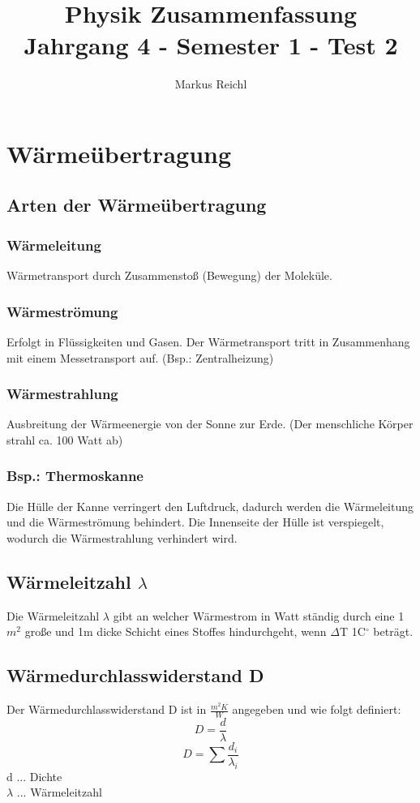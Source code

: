 \documentclass[a4paper,12pt]{article}
\title{Physik Zusammenfassung\\	\large{Jahrgang 4 - Semester 1 - Test 2}}
\author{Markus Reichl}
\begin{document}
\maketitle

\tableofcontents

\newpage

\section{Wärmeübertragung}
\subsection{Arten der Wärmeübertragung}
\subsubsection{Wärmeleitung}
Wärmetransport durch Zusammenstoß (Bewegung) der Moleküle.
\subsubsection{Wärmeströmung}
Erfolgt in Flüssigkeiten und Gasen. Der Wärmetransport tritt in Zusammenhang mit einem Messetransport auf. (Bsp.: Zentralheizung)
\subsubsection{Wärmestrahlung}
Ausbreitung der Wärmeenergie von der Sonne zur Erde. (Der menschliche Körper strahl ca. 100 Watt ab)
\subsubsection{Bsp.: Thermoskanne}
Die Hülle der Kanne verringert den Luftdruck, dadurch werden die Wärmeleitung und die Wärmeströmung behindert.
Die Innenseite der Hülle ist verspiegelt, wodurch die Wärmestrahlung verhindert wird.

\subsection{Wärmeleitzahl $\lambda$}
Die Wärmeleitzahl $\lambda$ gibt an welcher Wärmestrom in Watt ständig durch eine 1$m^2$ große und 1m dicke Schicht eines Stoffes hindurchgeht, wenn $\Delta$T 1C$^\circ$ beträgt.

\subsection{Wärmedurchlasswiderstand D}
Der Wärmedurchlasswiderstand D ist in $\frac{m^2 K}{W}$ angegeben und wie folgt definiert:
$$D = \frac{d}{\lambda}$$
$$D = \sum \frac{d_i}{\lambda_i}$$
d ... Dichte\\
$\lambda$ ... Wärmeleitzahl
\end{document}
